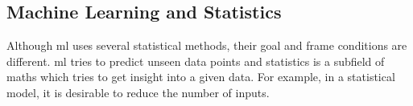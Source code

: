 \subsection{Machine Learning and Statistics}

Although \gls{ml} uses several statistical methods, their goal and frame conditions are different. 
%
%
\Gls{ml} tries to predict unseen data points and statistics is a subfield of maths 
which tries to get insight into a given data. 
For example, in a statistical model, it is desirable to reduce the number of inputs. 
